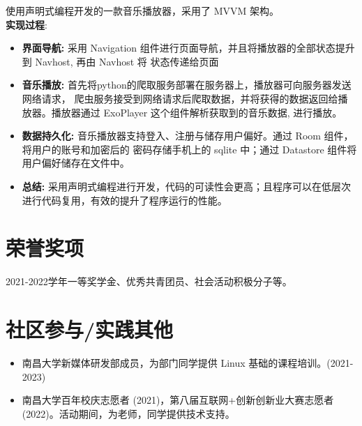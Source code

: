 \documentclass{resume}
\begin{document}
  使用声明式编程开发的一款音乐播放器，采用了 MVVM 架构。 
 \\   \textbf{实现过程}:  
\begin{itemize}
  \item \textbf{界面导航: } 采用 Navigation 组件进行页面导航，并且将播放器的全部状态提升到 Navhost, 再由 Navhost 将
  状态传递给页面
  \item \textbf{音乐播放: } 首先将python的爬取服务部署在服务器上，播放器可向服务器发送网络请求，
    爬虫服务接受到网络请求后爬取数据，并将获得的数据返回给播放器。播放器通过 ExoPlayer 这个组件解析获取到的音乐数据,
    进行播放。
  \item \textbf{数据持久化: } 音乐播放器支持登入、注册与储存用户偏好。通过 Room 组件，将用户的账号和加密后的
  密码存储手机上的 sqlite 中；通过 Datastore 组件将用户偏好储存在文件中。
  \item \textbf{总结: } 采用声明式编程进行开发，代码的可读性会更高；且程序可以在低层次进行代码复用，有效的提升了程序运行的性能。
\end{itemize}

\section{荣誉奖项}
2021-2022学年一等奖学金、优秀共青团员、社会活动积极分子等。

\section{社区参与/实践其他}
\begin{itemize}[parsep=0.2ex]
  \item 南昌大学新媒体研发部成员，为部门同学提供 Linux 基础的课程培训。(2021-2023)
  \item 南昌大学百年校庆志愿者 (2021)，第八届互联网+创新创新业大赛志愿者(2022)。活动期间，为老师，同学提供技术支持。
\end{itemize}
\end{document}
